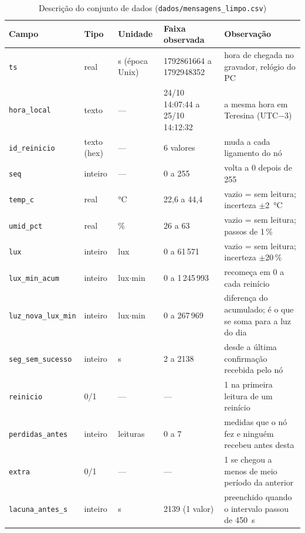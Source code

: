 \begin{table}[H]
\centering
\caption{Descrição do conjunto de dados (\texttt{dados/mensagens\_limpo.csv})}
\label{tab:dataset}
\footnotesize
\setlength{\tabcolsep}{3.5pt}
\begin{tabular}{@{}L{3.0cm}L{1.5cm}L{1.9cm}L{2.6cm}L{5.0cm}@{}}
\toprule
\textbf{Campo} & \textbf{Tipo} & \textbf{Unidade} & \textbf{Faixa observada} & \textbf{Observação} \\
\midrule
\texttt{ts} & real & s (época Unix) & 1792861664 a 1792948352 & hora de chegada no gravador, relógio do PC \\
\texttt{hora\_local} & texto & --- & 24/10 14:07:44 a 25/10 14:12:32 & a mesma hora em Teresina (UTC$-$3) \\
\texttt{id\_reinicio} & texto (hex) & --- & 6 valores & muda a cada ligamento do nó \\
\texttt{seq} & inteiro & --- & 0 a 255 & volta a 0 depois de 255 \\
\texttt{temp\_c} & real & \si{\celsius} & 22,6 a 44,4 & vazio = sem leitura; incerteza $\pm$\SI{2}{\celsius} \\
\texttt{umid\_pct} & real & \% & 26 a 63 & vazio = sem leitura; passos de 1\,\% \\
\texttt{lux} & inteiro & lux & 0 a 61\,571 & vazio = sem leitura; incerteza $\pm$20\,\% \\
\texttt{lux\_min\_acum} & inteiro & lux$\cdot$min & 0 a 1\,245\,993 & recomeça em 0 a cada reinício \\
\texttt{luz\_nova\_lux\_min} & inteiro & lux$\cdot$min & 0 a 267\,969 & diferença do acumulado; é o que se soma para a luz do dia \\
\texttt{seg\_sem\_sucesso} & inteiro & s & 2 a 2138 & desde a última confirmação recebida pelo nó \\
\texttt{reinicio} & 0/1 & --- & --- & 1 na primeira leitura de um reinício \\
\texttt{perdidas\_antes} & inteiro & leituras & 0 a 7 & medidas que o nó fez e ninguém recebeu antes desta \\
\texttt{extra} & 0/1 & --- & --- & 1 se chegou a menos de meio período da anterior \\
\texttt{lacuna\_antes\_s} & inteiro & s & 2139 (1 valor) & preenchido quando o intervalo passou de \SI{450}{\second} \\
\bottomrule
\end{tabular}
\end{table}

